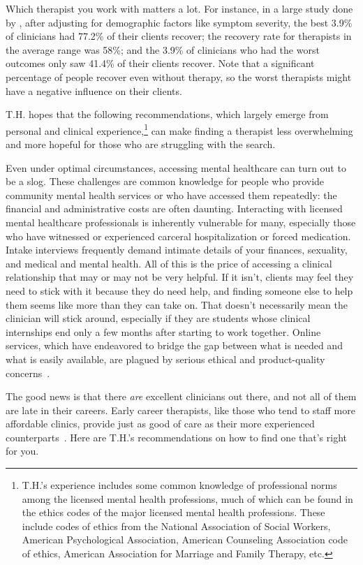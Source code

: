 \documentclass[11pt,oneside]{book}
\let\cite\parencite
\begin{document}
Which therapist you work with matters a lot. For instance, in a large study done by \textcite{firth2019therapistEffects}, after adjusting for demographic factors like symptom severity, the best 3.9\% of clinicians had 77.2\% of their clients recover; the recovery rate for therapists in the average range was 58\%; and the 3.9\% of clinicians who had the worst outcomes only saw 41.4\% of their clients recover. Note that a significant percentage of people recover even without therapy, so the worst therapists might have a negative influence on their clients.

T.H. hopes that the following recommendations, which largely emerge from personal and clinical experience,\footnote{T.H.'s experience includes some common knowledge of professional norms among the licensed mental health professions, much of which can be found in the ethics codes of the major licensed mental health professions. These include codes of ethics from the National Association of Social Workers, American Psychological Association, American Counseling Association code of ethics, American Association for Marriage and Family Therapy, etc.} can make finding a therapist less overwhelming and more hopeful for those who are struggling with the search.

Even under optimal circumstances, accessing mental healthcare can turn out to be a slog. These challenges are common knowledge for people who provide community mental health services or who have accessed them repeatedly: the financial and administrative costs are often daunting. Interacting with licensed mental healthcare professionals is inherently vulnerable for many, especially those who have witnessed or experienced carceral hospitalization or forced medication. Intake interviews frequently demand intimate details of your finances, sexuality, and medical and mental health. All of this is the price of accessing a clinical relationship that may or may not be very helpful. If it isn't, clients may feel they need to stick with it because they do need help, and finding someone else to help them seems like more than they can take on. That doesn't necessarily mean the clinician will stick around, especially if they are students whose clinical internships end only a few months after starting to work together. Online services, which have endeavored to bridge the gap between what is needed and what is easily available, are plagued by serious ethical and product-quality concerns~\cite{betterhelp1,betterhelp3,talkspace1,doneglobal1}.

The good news is that there \textit{are} excellent clinicians out there, and not all of them are late in their careers. Early career therapists, like those who tend to staff more affordable clinics, provide just as good of care as their more experienced counterparts~\cite{goldberg2016psychotherapists}. Here are T.H.'s recommendations on how to find one that's right for you.
\end{document}
